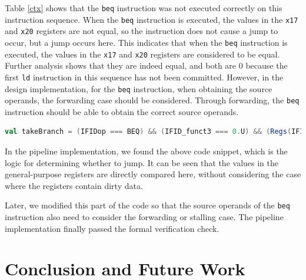 \documentclass[conference]{IEEEtran}
\theoremstyle{definition}
\begin{document}
Table \ref{ctx} shows that the \verb|beq| instruction was not executed correctly on this instruction sequence.
When the \verb|beq| instruction is executed, the values in the \verb|x17| and \verb|x20| registers are not equal, so the instruction does not cause a jump to occur, but a jump occurs here.
This indicates that when the \verb|beq| instruction is executed, the values in the \verb|x17| and \verb|x20| registers are considered to be equal.
Further analysis shows that they are indeed equal, and both are 0 because the first \verb|ld| instruction in this sequence has not been committed.
However, in the design implementation, for the \verb|beq| instruction, when obtaining the source operands, the forwarding case should be considered.
Through forwarding, the \verb|beq| instruction should be able to obtain the correct source operands.

\begin{lstlisting}[language=scala, caption={A Code Snippet in the Pipeline Design}, label=designcode]
val takeBranch = (IFIDop === BEQ) && (IFID_funct3 === 0.U) && (Regs(IFIDrs1) === Regs(IFIDrs2))
\end{lstlisting}

In the pipeline implementation, we found the above code snippet, which is the logic for determining whether to jump.
It can be seen that the values in the general-purpose registers are directly compared here, without considering the case where the registers contain dirty data.

Later, we modified this part of the code so that the source operands of the \verb|beq| instruction also need to consider the forwarding or stalling case. 
The pipeline implementation finally passed the formal verification check.

\section{Conclusion and Future Work}





\end{document}
